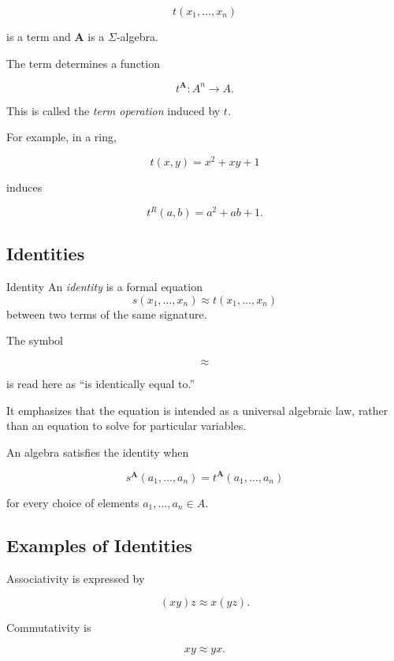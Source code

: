 \[ t(x_1,\ldots,x_n) \]

is a term and \(\mathbf A\) is a \(\Sigma\)-algebra.

The term determines a function

\[ t^{\mathbf A}:A^n\to A. \]

This is called the \emph{term operation} induced by \(t\).

For example, in a ring,

\[ t(x,y)=x^2+xy+1 \]

induces

\[ t^R(a,b)=a^2+ab+1. \]

\subsection{Identities}
\label{subsec:universal-identities}

\begin{definitionbox}{Identity}
An \emph{identity} is a formal equation
\[ s(x_1,\ldots,x_n)\approx t(x_1,\ldots,x_n) \]
between two terms of the same signature.
\end{definitionbox}

The symbol

\[ \approx \]

is read here as ``is identically equal to.''

It emphasizes that the equation is intended as a universal algebraic law,
rather than an equation to solve for particular variables.

An algebra satisfies the identity when

\[ s^{\mathbf A}(a_1,\ldots,a_n)
=t^{\mathbf A}(a_1,\ldots,a_n) \]

for every choice of elements \(a_1,\ldots,a_n\in A\).

\subsection{Examples of Identities}
\label{subsec:identity-examples}

Associativity is expressed by

\[ (xy)z\approx x(yz). \]

Commutativity is

\[ xy\approx yx. \]

